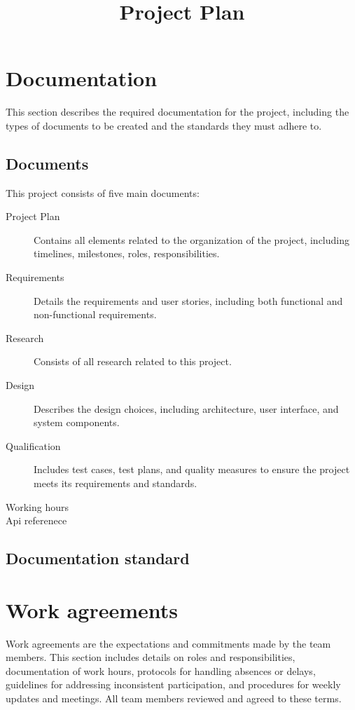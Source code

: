 \documentclass{projdoc}
\title{Project Plan}
\begin{document}
\tablestables
\newpage

\section{Documentation}

This section describes the required documentation for the project, including the
 types of documents to be created and the standards they must adhere to.

\subsection{Documents}

This project consists of five main documents:\noparbreak

\begin{description}
	\item[Project Plan] Contains all elements related to the organization of the
	 project, including timelines, milestones, roles, responsibilities.
	\item[Requirements] Details the requirements and 
	user stories, including both functional and non-functional requirements. 
	\item[Research] Consists of all research related to this project.
	\item[Design] Describes the design choices, including architecture,
	 user interface, and system components.
	\item[Qualification] Includes test cases, test plans, and quality 
	measures to ensure the project meets its requirements and standards.
	\item[Working hours] 
	\item[Api referenece]  
\end{description}

\subsection{Documentation standard}

\newpage

\section{Work agreements}
Work agreements are the expectations and commitments made by the team members. 
This section includes details on roles and responsibilities, documentation of 
work hours, protocols for handling absences or delays, guidelines for addressing
 inconsistent participation, and procedures for weekly updates and meetings. All
  team members reviewed and agreed to these terms.
\end{document}
